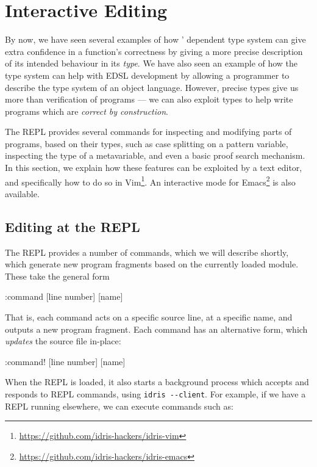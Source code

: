 \section{Interactive Editing}

By now, we have seen several examples of how \Idris{}' dependent type system can give extra confidence in a function's correctness by giving a more precise description of its intended behaviour in its \emph{type}.
We have also seen an example of how the type system can help with EDSL development by allowing a programmer to describe the type system of an object language.
However, precise types give us more than verification of programs --- we can also exploit types to help write programs which are \emph{correct by construction}.

The \Idris{} REPL provides several commands for inspecting and modifying parts of programs, based on their types, such as case splitting on a pattern variable, inspecting the type of a metavariable, and even a basic proof search mechanism.
In this section, we explain how these features can be exploited by a text editor, and specifically how to do so in Vim\footnote{\url{https://github.com/idris-hackers/idris-vim}}. 
An interactive mode for
Emacs\footnote{\url{https://github.com/idris-hackers/idris-emacs}} is also available.

\subsection{Editing at the REPL}

The REPL provides a number of commands, which we will describe shortly, which generate new program fragments based on the currently loaded module. These take the general form

\begin{code}
:command [line number] [name]
\end{code}

\noindent
That is, each command acts on a specific source line, at a specific name, and outputs a new program fragment. Each command has an alternative form, which \emph{updates} the source file in-place:

\begin{code}
:command! [line number] [name]
\end{code}

\noindent
When the REPL is loaded, it also starts a background process which accepts and responds to REPL commands, using \verb!idris --client!.
For example, if we have a REPL running elsewhere, we can execute commands such as:

